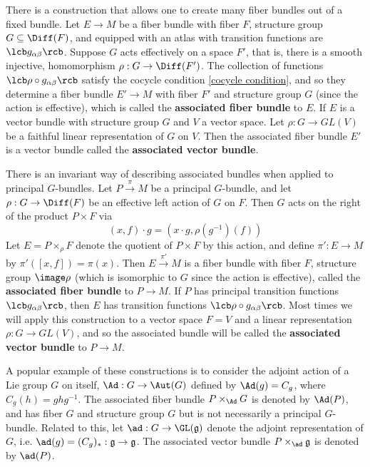 There is a construction that allows one to create many fiber bundles out of a fixed bundle. Let $E \rightarrow M$ be a fiber bundle with fiber $F$, structure group $G \subseteq \Diff(F)$, and equipped with an atlas with transition functions are $\lcb g_{\alpha\beta} \rcb$. Suppose $G$ acts effectively on a space $F'$, that is, there is a smooth injective, homomorphism $\rho : G \rightarrow \Diff(F')$. The collection of functions $\lcb \rho \circ g_{\alpha\beta} \rcb$ satisfy the cocycle condition \eqref{cocycle condition}, and so they determine a fiber bundle $E' \rightarrow M$ with fiber $F'$ and structure group $G$ (since the action is effective), which is called the \textbf{associated fiber bundle} to $E$. If $E$ is a vector bundle with structure group $G$ and $V$ a vector space. Let $\rho : G \rightarrow GL(V)$ be a faithful linear representation of $G$ on $V$. Then the associated fiber bundle $E'$ is a vector bundle called the \textbf{associated vector bundle}. 

There is an invariant way of describing associated bundles when applied to principal $G$-bundles. Let $P \stackrel{\pi}{\rightarrow} M$ be a principal $G$-bundle, and let $\rho : G \rightarrow \Diff(F)$ be an effective left action of $G$ on $F$. Then $G$ acts on the right of the product $P \times F$ via
\begin{equation}
\label{associated bundle action}
(x,f) \cdot g = (x \cdot g, \rho(g^{-1})(f))
\end{equation}
Let $E = P \times_\rho F$ denote the quotient of $P \times F$ by this action, and define $\pi' : E \rightarrow M$ by $\pi'([x,f]) = \pi(x)$. Then $E \stackrel{\pi'}{\rightarrow} M$ is a fiber bundle with fiber $F$, structure group $\image \rho$ (which is isomorphic to $G$ since the action is effective), called the \textbf{associated fiber bundle} to $P \rightarrow M$. If $P$ has principal transition functions $\lcb g_{\alpha\beta} \rcb$, then $E$ has transition functions $\lcb \rho \circ g_{\alpha\beta} \rcb$. Most times we will apply this construction to a vector space $F=V$ and a linear representation $\rho : G \rightarrow GL(V)$, and so the associated bundle will be called the \textbf{associated vector bundle} to $P \rightarrow M$.


A popular example of these constructions is to consider the adjoint action of a Lie group $G$ on itself, $\Ad : G \rightarrow \Aut(G)$ defined by $\Ad(g) = C_g$, where $C_g(h) = ghg^{-1}$. The associated fiber bundle $P \times_{\Ad} G$ is denoted by $\Ad(P)$, and has fiber $G$ and structure group $G$ but is not necessarily a principal $G$-bundle. Related to this, let $\ad : G \rightarrow \GL(\mathfrak g)$ denote the adjoint representation of $G$, i.e. $\ad(g) = (C_g)_* : \mathfrak g \rightarrow \mathfrak g$. The associated vector bundle $P \times_{\ad} \mathfrak g$ is denoted by $\ad(P)$. 








